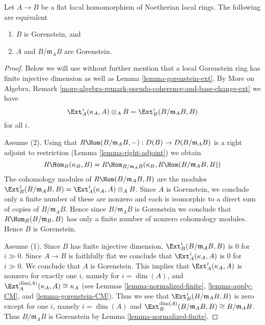 \begin{lemma}
\label{lemma-flat-under-gorenstein}
Let $A \to B$ be a flat local homomorphism of Noetherian local rings.
The following are equivalent
\begin{enumerate}
\item $B$ is Gorenstein, and
\item $A$ and $B/\mathfrak m_A B$ are Gorenstein.
\end{enumerate}
\end{lemma}

\begin{proof}
Below we will use without further mention that a local Gorenstein ring
has finite injective dimension as well as Lemma \ref{lemma-gorenstein-ext}.
By More on Algebra, Remark
\ref{more-algebra-remark-pseudo-coherence-and-base-change-ext}
we have
$$
\Ext^i_A(\kappa_A, A) \otimes_A B =
\Ext^i_B(B/\mathfrak m_A B, B)
$$
for all $i$.

\medskip\noindent
Assume (2). Using that
$R\Hom(B/\mathfrak m_A B, -) : D(B) \to D(B/\mathfrak m_A B)$ is a
right adjoint to restriction (Lemma \ref{lemma-right-adjoint}) we obtain
$$
R\Hom_B(\kappa_B, B) =
R\Hom_{B/\mathfrak m_A B}(\kappa_B, R\Hom(B/\mathfrak m_A B, B))
$$
The cohomology modules of $R\Hom(B/\mathfrak m_A B, B)$ are the modules
$\Ext^i_B(B/\mathfrak m_A B, B) =
\Ext^i_A(\kappa_A, A) \otimes_A B$.
Since $A$ is Gorenstein, we conclude only a finite number of these are nonzero
and each is isomorphic to a direct sum of copies of $B/\mathfrak m_A B$.
Hence since $B/\mathfrak m_A B$ is Gorenstein we conclude that
$R\Hom_B(B/\mathfrak m_B, B)$ has only a finite number of nonzero
cohomology modules. Hence $B$ is Gorenstein.

\medskip\noindent
Assume (1). Since $B$ has finite injective dimension,
$\Ext^i_B(B/\mathfrak m_A B, B)$ is $0$ for $i \gg 0$.
Since $A \to B$ is faithfully flat
we conclude that $\Ext^i_A(\kappa_A, A)$ is $0$
for $i \gg 0$. We conclude that $A$ is Gorenstein. This implies that
$\Ext^i_A(\kappa_A, A)$ is nonzero for exactly one $i$,
namely for $i = \dim(A)$, and
$\Ext^{\dim(A)}_A(\kappa_A, A) \cong \kappa_A$
(see Lemmas \ref{lemma-normalized-finite}, \ref{lemma-apply-CM}, and
\ref{lemma-gorenstein-CM}).
Thus we see that
$\Ext^i_B(B/\mathfrak m_A B, B)$ is zero except for one $i$,
namely $i = \dim(A)$ and
$\Ext^{\dim(A)}_B(B/\mathfrak m_A B, B) \cong B/\mathfrak m_A B$.
Thus $B/\mathfrak m_A B$ is Gorenstein by
Lemma \ref{lemma-normalized-finite}.
\end{proof}

